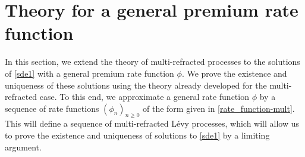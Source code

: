 \documentclass[12pt,reqno]{amsart}
\theoremstyle{definition}
\theoremstyle{remark}
\begin{document}


\section{Theory for a general premium rate function }\label{general premium}
In this section, we extend the theory of multi-refracted processes to the solutions of \eqref{sde1} with 
a general premium rate function {$\phi$}. We prove the existence and uniqueness of these solutions using the theory
already developed for the multi-refracted case. To this end, we approximate a general rate function $\phi$ 
by a sequence of rate functions $(\phi_n)_{n\geq0}$ of the form given in \eqref{rate_function-mult}. This will define a sequence of multi-refracted L\'evy processes, which will allow us to prove the existence and uniqueness 
of solutions to \eqref{sde1} by a limiting argument. 
\end{document}

